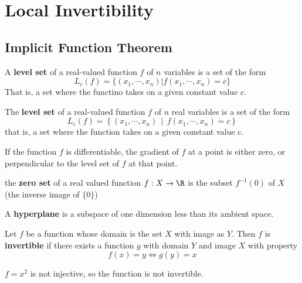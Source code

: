\documentclass[11pt]{article}
\begin{document}
\section*{Local Invertibility}

\subsection*{Implicit Function Theorem}

\begin{defn*}
  A \textbf{level set} of a real-valued function $f$ of $n$ variables is a set of the form
  \[
    L_c(f) = \{ (x_1, \cdots, x_n) | f(x_1, \cdots, x_n) = c\}
  \]
  That is, a set where the functino takes on a given constant value $c$.
\end{defn*}


\begin{defn*}
  The \textbf{level set} of a real-valued function $f$ of $n$ real variables is a set of the form
  \[
    L_{c}(f)=\left\{(x_{1},\cdots ,x_{n})\,\mid \,f(x_{1},\cdots ,x_{n})=c\right\}
  \]
that is, a set where the function takes on a given constant value c.
\end{defn*}

\begin{theorem*}
   If the function $f$ is differentiable, the gradient of $f$ at a point is either zero, or perpendicular to the level set of $f$ at that point.
\end{theorem*}


\begin{defn*}
  the \textbf{zero set} of a real valued function $f: X\to \R$ is the subset $f^{-1}(0)$ of $X$ (the inverse image of $\{ 0\}$)
\end{defn*}


\begin{defn*}
  A \textbf{hyperplane} is a subspace of one dimension less than its ambient space.
\end{defn*}

\begin{defn*}
  Let $f$ be a function whose domain is the set $X$ with image as $Y$. Then $f$ is \textbf{invertible} if there exists a function $g$ with domain $Y$ and image $X$ with property
  \[
    f(x) = y \iff g(y) = x
  \]
  \begin{rem}
    $f = x^2$ is not injective, so the function is not invertible.
  \end{rem}
\end{defn*}
\end{document}
